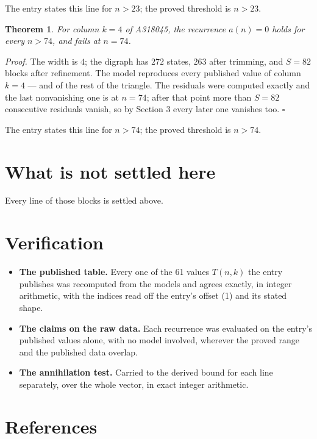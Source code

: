 \documentclass[11pt]{article}
\newtheorem{theorem}{Theorem}
\theoremstyle{definition}
\begin{document}
The entry states this line for $n > 23$; the proved threshold is $n > 23$.

\begin{theorem} For column $k = 4$ of A318045, the recurrence $a(n) = 0$ holds for every $n > 74$, and fails at $n = 74$.\end{theorem}

{\itshape Proof.} The width is $4$; the digraph has $272$ states, $263$ after trimming, and $S = 82$ blocks after refinement. The model reproduces every published value of column $k = 4$ --- and of the rest of the triangle. The residuals were computed exactly and the last nonvanishing one is at $n = 74$; after that point more than $S = 82$ consecutive residuals vanish, so by Section 3 every later one vanishes too. $\square$

The entry states this line for $n > 74$; the proved threshold is $n > 74$.

\section{What is not settled here}

Every line of those blocks is settled above.

\section{Verification}

\begin{itemize}

\item {\bfseries The published table.} Every one of the 61 values $T(n,k)$ the entry publishes was recomputed from the models and agrees exactly, in integer arithmetic, with the indices read off the entry's offset (1) and its stated shape.

\item {\bfseries The claims on the raw data.} Each recurrence was evaluated on the entry's published values alone, with no model involved, wherever the proved range and the published data overlap.

\item {\bfseries The annihilation test.} Carried to the derived bound for each line separately, over the whole vector, in exact integer arithmetic.

\end{itemize}

\section{References}
\end{document}
